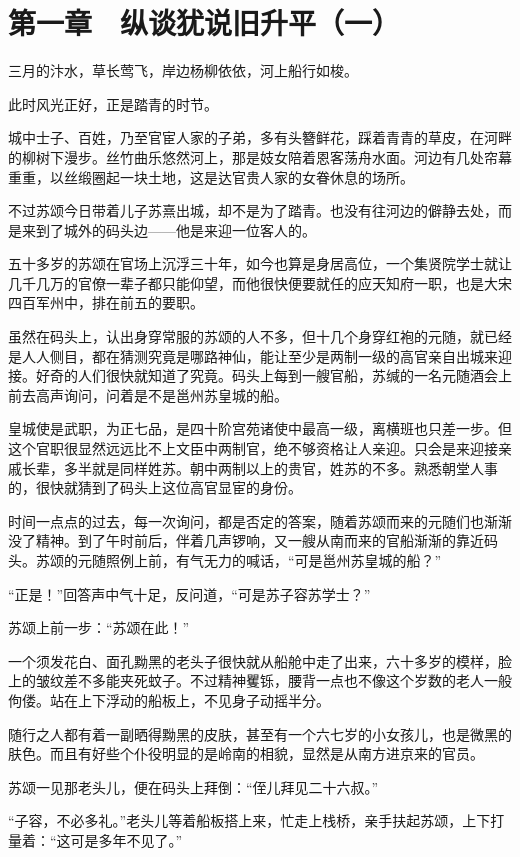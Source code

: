 \section{第一章　纵谈犹说旧升平（一）}

三月的汴水，草长莺飞，岸边杨柳依依，河上船行如梭。

此时风光正好，正是踏青的时节。

城中士子、百姓，乃至官宦人家的子弟，多有头簪鲜花，踩着青青的草皮，在河畔的柳树下漫步。丝竹曲乐悠然河上，那是妓女陪着恩客荡舟水面。河边有几处帘幕重重，以丝缎圈起一块土地，这是达官贵人家的女眷休息的场所。

不过苏颂今日带着儿子苏熹出城，却不是为了踏青。也没有往河边的僻静去处，而是来到了城外的码头边——他是来迎一位客人的。

五十多岁的苏颂在官场上沉浮三十年，如今也算是身居高位，一个集贤院学士就让几千几万的官僚一辈子都只能仰望，而他很快便要就任的应天知府一职，也是大宋四百军州中，排在前五的要职。

虽然在码头上，认出身穿常服的苏颂的人不多，但十几个身穿红袍的元随，就已经是人人侧目，都在猜测究竟是哪路神仙，能让至少是两制一级的高官亲自出城来迎接。好奇的人们很快就知道了究竟。码头上每到一艘官船，苏缄的一名元随酒会上前去高声询问，问着是不是邕州苏皇城的船。

皇城使是武职，为正七品，是四十阶宫苑诸使中最高一级，离横班也只差一步。但这个官职很显然远远比不上文臣中两制官，绝不够资格让人亲迎。只会是来迎接亲戚长辈，多半就是同样姓苏。朝中两制以上的贵官，姓苏的不多。熟悉朝堂人事的，很快就猜到了码头上这位高官显宦的身份。

时间一点点的过去，每一次询问，都是否定的答案，随着苏颂而来的元随们也渐渐没了精神。到了午时前后，伴着几声锣响，又一艘从南而来的官船渐渐的靠近码头。苏颂的元随照例上前，有气无力的喊话，“可是邕州苏皇城的船？”

“正是！”回答声中气十足，反问道，“可是苏子容苏学士？”

苏颂上前一步：“苏颂在此！”

一个须发花白、面孔黝黑的老头子很快就从船舱中走了出来，六十多岁的模样，脸上的皱纹差不多能夹死蚊子。不过精神矍铄，腰背一点也不像这个岁数的老人一般佝偻。站在上下浮动的船板上，不见身子动摇半分。

随行之人都有着一副晒得黝黑的皮肤，甚至有一个六七岁的小女孩儿，也是微黑的肤色。而且有好些个仆役明显的是岭南的相貌，显然是从南方进京来的官员。

苏颂一见那老头儿，便在码头上拜倒：“侄儿拜见二十六叔。”

“子容，不必多礼。”老头儿等着船板搭上来，忙走上栈桥，亲手扶起苏颂，上下打量着：“这可是多年不见了。”

